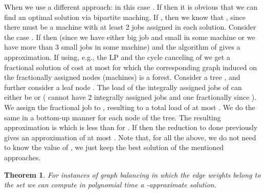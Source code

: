 \documentclass[11pt]{article}\usepackage{amsmath}
\newtheorem{theorem}{Theorem}[section]
\begin{document}
When   we use a different approach: in this case
. If  then it is obvious that we can find
an optimal solution via bipartite maching. If , then we know
that , since there must be a machine with at least 2 jobs
assigned in each solution. Consider the case . If  then  (since we have either  big job and  small in some machine or we have more than 3 small jobs in some machine) and the
algorithm of \cite{lenstra} gives a 
approximation. If  using, e.g., the LP and the cycle canceling
of \cite{ebenlendr} we get a fractional solution of cost  at most   for which the corresponding graph induced on the fractionally assigned nodes (machines) is a forest. Consider a tree , and further consider a leaf node . The load of the integrally assigned jobs of   can either be  or  ( cannot have 2 integrally assigned jobs and one fractionally since ). We assign the fractional job to , resulting to a total load of at most . We do the same in a bottom-up manner for each node of the tree. The resulting approximation is  which is less than  for . If  then the reduction to  done previously gives an approximation of at most . Note that, for all the above, we do not need  to know the value of , we just keep the best solution of the mentioned approaches.

\begin{theorem}
For instances of graph balancing in which the edge weights belong to
the set  we 
can compute in polynomial time  a -approximate solution.
\end{theorem}




\end{document}
